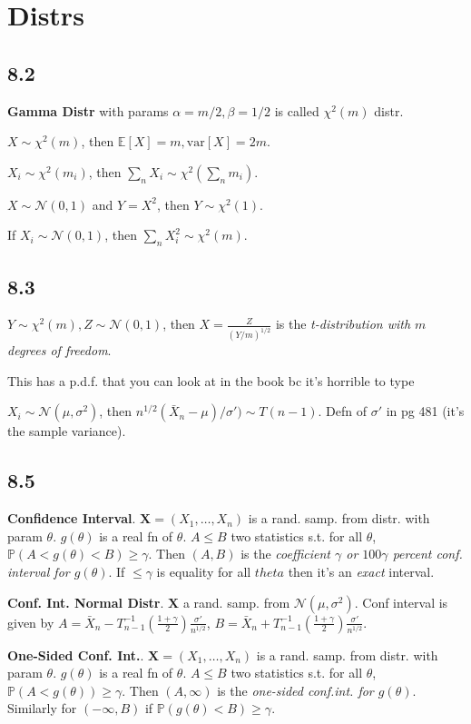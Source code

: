 \documentclass{article}
\renewcommand{\P}[1]{\mathbb{P}\left(#1\right)}
\newcommand{\E}[1]{\mathbb{E}\left[#1\right]}
\newcommand{\var}[1]{\text{var}\left[#1\right]}
\newcommand{\pdf}{p.d.f. }
\newcommand{\norm}[2]{\mathcal{N}(#1, #2)}
\begin{document}
\section*{Distrs}
\subsection*{8.2}
\textbf{Gamma Distr} with params $\alpha = m/2, \beta = 1/2$ is called
$\chi^2(m)$ distr.

$X \sim \chi^2(m)$, then $\E{X} = m, \var{X} = 2m$.

$X_i \sim \chi^2(m_i)$, then $\sum_n X_i \sim \chi^2(\sum_n m_i)$.

$X \sim \mathcal{N}(0,1)$ and $Y = X^2$, then $Y \sim \chi^2(1)$.

If $X_i \sim \mathcal{N}(0,1)$, then $\sum_n X_i^2 \sim \chi^2(m)$.

\subsection*{8.3}
$Y \sim \chi^2(m), Z \sim \mathcal{N}(0,1)$, then $X = \frac{Z}{(Y/m)^{1/2}}$
is the \textit{t-distribution with $m$ degrees of freedom}.

This has a \pdf that you can look at in the book bc it's horrible to type

$X_i \sim \norm{\mu}{\sigma^2}$, then $n^{1/2}(\bar{X}_n - \mu)/\sigma') \sim T(n-1)$.
Defn of $\sigma'$ in pg 481 (it's the sample variance).

\subsection*{8.5}
\textbf{Confidence Interval}.
$\bm{X} = (X_1,\dots,X_n)$ is a rand. samp. from distr. with param $\theta$.
$g(\theta)$ is a real fn of $\theta$. $A \leq B$ two statistics s.t. for all
$\theta$, $\P{A < g(\theta) < B} \geq \gamma$. Then $(A,B)$ is the
\textit{coefficient $\gamma$ or $100\gamma$ percent conf. interval for $g(\theta)$}.
If $\leq \gamma$ is equality for all $theta$ then it's an \textit{exact} interval.

\textbf{Conf. Int. Normal Distr}.
$\bm{X}$ a rand. samp. from $\norm{\mu}{\sigma^2}$. Conf interval is given by
$A = \bar{X}_n - T^{-1}_{n-1}\left(\frac{1 + \gamma}{2}\right)\frac{\sigma'}{n^{1/2}}$,
$B = \bar{X}_n + T^{-1}_{n-1}\left(\frac{1 + \gamma}{2}\right)\frac{\sigma'}{n^{1/2}}$.

\textbf{One-Sided Conf. Int.}.
$\bm{X} = (X_1,\dots,X_n)$ is a rand. samp. from distr. with param $\theta$.
$g(\theta)$ is a real fn of $\theta$. $A \leq B$ two statistics s.t. for all
$\theta$, $\P{A < g(\theta)} \geq \gamma$. Then $(A,\infty)$ is the 
\textit{one-sided conf.int. for $g(\theta)$}. Similarly for $(-\infty, B)$ if 
$\P{g(\theta) < B} \geq \gamma$.
\end{document}
